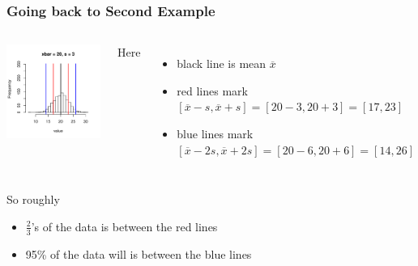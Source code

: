 \documentclass[handout]{beamer}
\begin{document}
\begin{frame}[fragile]
\frametitle{Going back to Second Example}

\begin{columns}
\begin{center}
\includegraphics[width=\textwidth]{figure/spread3.pdf}
\end{center}
\pause Here
\begin{itemize}
\item black line is mean $\overline{x}$
\item red lines mark $[\overline{x} - s, \overline{x} + s] = [20 - 3, 20 + 3] = [17, 23]$
\item blue lines mark $[\overline{x} - 2s, \overline{x} + 2s] = [20 - 6, 20 + 6] = [14, 26]$
\end{itemize}
\end{columns}
\pause So roughly
\begin{itemize}
\item $\frac{2}{3}$'s of the data is between the red lines
\item 95\% of the data will is between the blue lines
\end{itemize}

\end{frame}
\end{document}

